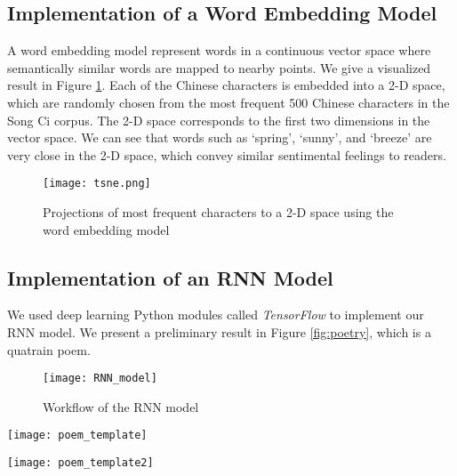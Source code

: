 \subsection{ Implementation of a Word Embedding Model }
A word embedding model represent words in a continuous vector space where semantically similar words are mapped to nearby points.
%
%
We give a visualized result in Figure \ref{fig:VSM}. 
%
Each of the Chinese characters is embedded into a 2-D space, which are randomly chosen from the most frequent 500 Chinese characters in the Song Ci corpus. The 2-D space corresponds to the first two dimensions in the vector space. We can see that words such as `spring', `sunny', and `breeze' are very close in the 2-D space, which convey similar sentimental feelings to readers.


\begin{figure}[htbp]
	\centering
	\texttt{[image: tsne.png]}
	\caption{Projections of most frequent characters to a 2-D space using the word embedding model}
	\label{fig:VSM}
\end{figure}



\subsection{Implementation of an RNN Model} 
%
We used deep learning Python modules called \emph{TensorFlow} \cite{tensorflow} to implement our RNN model. 
%
We present a preliminary result in Figure \ref{fig:poetry}, which is a quatrain poem.


\begin{figure}[htbp]
	\centering
	\texttt{[image: RNN\_model]}
	\caption{Workflow of the RNN model}
	\label{fig:rnn_workflow}
\end{figure}

\begin{figure*}[htbp]
	\centering
	\texttt{[image: poem\_template]}
	\caption{A Song Ci generated using LSTM}
	\label{fig:poetry}
\end{figure*}

\begin{figure*}[htbp]
	\centering
	\texttt{[image: poem\_template2]}
	\caption{A Song Ci generated using Genetic Algorithm }
	\label{fig:poetry}
\end{figure*}
